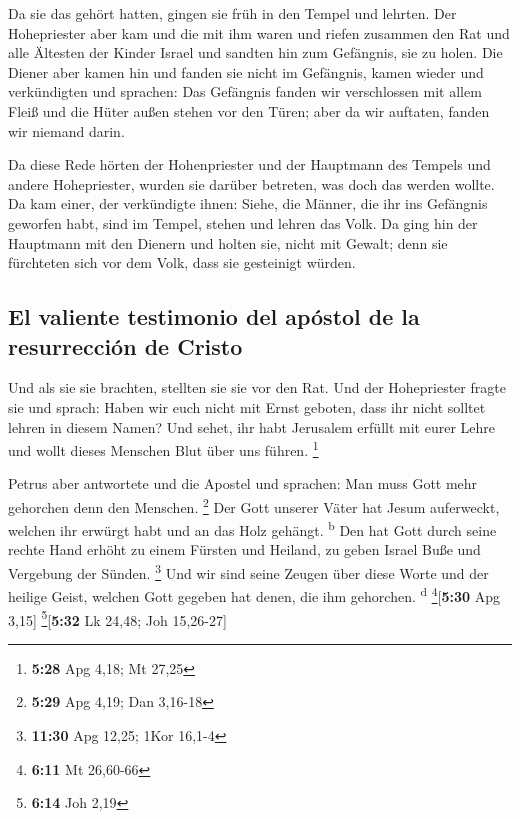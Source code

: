 Da sie das gehört hatten, gingen sie früh in den Tempel
und lehrten. Der Hohepriester aber kam und die mit ihm waren und riefen
zusammen den Rat und alle Ältesten der Kinder Israel und sandten hin zum
Gefängnis, sie zu holen.  Die Diener aber kamen hin und
fanden sie nicht im Gefängnis, kamen wieder und verkündigten
 und sprachen: Das Gefängnis fanden wir verschlossen mit
allem Fleiß und die Hüter außen stehen vor den Türen; aber da wir
auftaten, fanden wir niemand darin.

 Da diese Rede hörten der Hohenpriester und der Hauptmann
des Tempels und andere Hohepriester, wurden sie darüber betreten, was
doch das werden wollte.  Da kam einer, der verkündigte
ihnen: Siehe, die Männer, die ihr ins Gefängnis geworfen habt, sind im
Tempel, stehen und lehren das Volk.  Da ging hin der
Hauptmann mit den Dienern und holten sie, nicht mit Gewalt; denn sie
fürchteten sich vor dem Volk, dass sie gesteinigt würden.

\hypertarget{el-valiente-testimonio-del-apuxf3stol-de-la-resurrecciuxf3n-de-cristo}{%
\subsection{El valiente testimonio del apóstol de la resurrección de
Cristo}\label{el-valiente-testimonio-del-apuxf3stol-de-la-resurrecciuxf3n-de-cristo}}

 Und als sie sie brachten, stellten sie sie vor den Rat.
Und der Hohepriester fragte sie  und sprach: Haben wir
euch nicht mit Ernst geboten, dass ihr nicht solltet lehren in diesem
Namen? Und sehet, ihr habt Jerusalem erfüllt mit eurer Lehre und wollt
dieses Menschen Blut über uns führen. \footnote{\textbf{5:28} Apg 4,18;
  Mt 27,25}

 Petrus aber antwortete und die Apostel und sprachen: Man
muss Gott mehr gehorchen denn den Menschen. \footnote{\textbf{5:29} Apg
  4,19; Dan 3,16-18}  Der Gott unserer Väter hat Jesum
auferweckt, welchen ihr erwürgt habt und an das Holz gehängt.
\textsuperscript{b}  Den hat Gott durch seine rechte Hand
erhöht zu einem Fürsten und Heiland, zu geben Israel Buße und Vergebung
der Sünden. \footnote{\textbf{11:30} Apg 12,25; 1Kor 16,1-4}
 Und wir sind seine Zeugen über diese Worte und der
heilige Geist, welchen Gott gegeben hat denen, die ihm gehorchen.
\textsuperscript{d} \footnote{\textbf{6:11} Mt 26,60-66}{[}\textbf{5:30}
Apg 3,15{]} \footnote{\textbf{6:14} Joh 2,19}{[}\textbf{5:32} Lk 24,48;
Joh 15,26-27{]}

